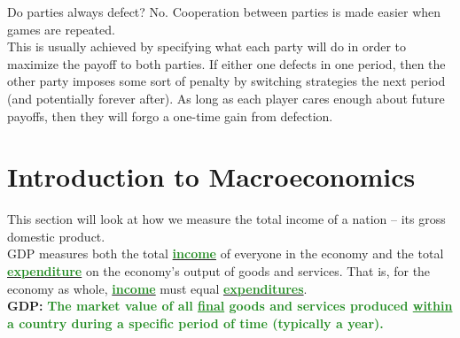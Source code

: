 \documentclass[11pt]{article}\usepackage[]{graphicx}\usepackage[]{color}
\theoremstyle{definition}
\newcommand{\ddp}[1]{{\textbf{\textcolor{ForestGreen}{#1}}}}
\newcommand{\dd}[1]{{\underline{\textbf{\textcolor{ForestGreen}{#1}}}}}
\newcommand{\defn}[1]{\textbf{#1}}
\begin{document}
	
	Do parties always defect? No. Cooperation between parties is made easier when games are repeated.
	\\
	
	This is usually achieved by specifying what each party will do in order to maximize the payoff to both parties. If either one defects in one period, then the other party imposes some sort of penalty by switching strategies the next period (and potentially forever after). As long as each player cares enough about future payoffs, then they will forgo a one-time gain from defection.
	
\newpage	

\section{Introduction to Macroeconomics}

This section will look at how we measure the total income of a nation -- its gross domestic product. 
\\

GDP measures both the total \dd{income} of everyone in the economy and the total \\ \dd{expenditure} on the economy's output of goods and services. That is, for the economy as whole, \dd{income} must equal \dd{expenditures}. 
\\

\defn{GDP:} \ddp{The market value of all \underline{final} goods and services produced \underline{within} a country during a specific period of time (typically a year).\\}
\end{document}
